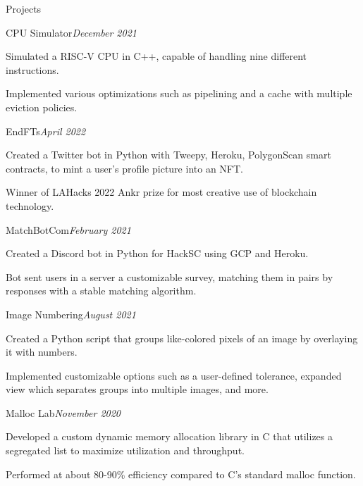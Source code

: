 \documentclass{resume} %
\begin{document}
\begin{rSection}{Projects}

\begin{rSubsection}{CPU Simulator}{\em December 2021}{}{}
\item Simulated a RISC-V CPU in C++, capable of handling nine different instructions.
\item Implemented various optimizations such as pipelining and a cache with multiple eviction policies.
\end{rSubsection}

\begin{rSubsection}{EndFTs}{\em April 2022}{}{}
\item Created a Twitter bot in Python with Tweepy, Heroku, PolygonScan smart contracts, to mint a user's profile picture into an NFT.
\item Winner of LAHacks 2022 Ankr prize for most creative use of blockchain technology.
\end{rSubsection}

\begin{rSubsection}{MatchBotCom}{\em February 2021}{}{}
\item Created a Discord bot in Python for HackSC using GCP and Heroku. 
\item Bot sent users in a server a customizable survey, matching them in pairs by responses with a stable matching algorithm.
\end{rSubsection}


\begin{rSubsection}{Image Numbering}{\em August 2021}{}{}
\item Created a Python script that groups like-colored pixels of an image by overlaying it with numbers.
\item Implemented customizable options such as a user-defined tolerance, expanded view which separates groups into multiple images, and more.
\end{rSubsection}

\begin{rSubsection}{Malloc Lab}{\em November 2020}{}{}
\item Developed a custom dynamic memory allocation library in C that utilizes a segregated list to maximize utilization and throughput.
\item Performed at about 80-90\% efficiency compared to C's standard malloc function.
\end{rSubsection}




\end{rSection}
\end{document}
